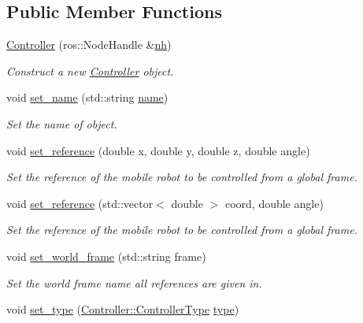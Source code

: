 \subsection*{Public Member Functions}
\begin{DoxyCompactItemize}
\item 
\hyperlink{classController_a7341f9092e1977cdd2a1492c4422c019}{Controller} (ros\+::\+Node\+Handle \&\hyperlink{classController_a24e3d3c2536f6ed29018bad1fd53dae2}{nh})
\begin{DoxyCompactList}\small\item\em Construct a new \hyperlink{classController}{Controller} object. \end{DoxyCompactList}\item 
void \hyperlink{classController_a88f2d54fedd04bd767e4d6e36e6dc2b3}{set\+\_\+name} (std\+::string \hyperlink{classController_af81f22d8b64d915769acfb8e8d89e0c8}{name})
\begin{DoxyCompactList}\small\item\em Set the name of object. \end{DoxyCompactList}\item 
void \hyperlink{classController_ade57ae23226a7565521694c87ec79c90}{set\+\_\+reference} (double x, double y, double z, double angle)
\begin{DoxyCompactList}\small\item\em Set the reference of the mobile robot to be controlled from a global frame. \end{DoxyCompactList}\item 
void \hyperlink{classController_aefad16ae5d5df8baac0ed044018eb6c6}{set\+\_\+reference} (std\+::vector$<$ double $>$ coord, double angle)
\begin{DoxyCompactList}\small\item\em Set the reference of the mobile robot to be controlled from a global frame. \end{DoxyCompactList}\item 
void \hyperlink{classController_aeeb360dd2e4afb5c654f5bca4c0f00ca}{set\+\_\+world\+\_\+frame} (std\+::string frame)
\begin{DoxyCompactList}\small\item\em Set the world frame name all references are given in. \end{DoxyCompactList}\item 
void \hyperlink{classController_a4ce725cf5efb9938d559740e447308f5}{set\+\_\+type} (\hyperlink{classController_aa6d956c4c220461a4152415ffa78690a}{Controller\+::\+Controller\+Type} \hyperlink{classController_a17792cff397dc69baca568c7d03f2fc8}{type})

\end{DoxyCompactItemize}
